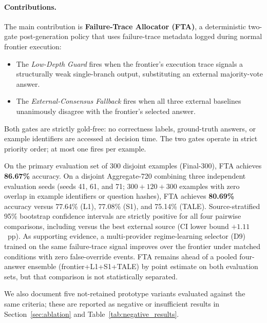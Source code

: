 \paragraph{Contributions.}
The main contribution is \textbf{Failure-Trace Allocator (FTA)}, a deterministic
two-gate post-generation policy that uses failure-trace metadata logged during normal
frontier execution:
\begin{itemize}[leftmargin=1.4em,itemsep=2pt]
  \item The \textit{Low-Depth Guard} fires when the frontier's execution trace signals
        a structurally weak single-branch output, substituting an external majority-vote
        answer.
  \item The \textit{External-Consensus Fallback} fires when all three external baselines
        unanimously disagree with the frontier's selected answer.
\end{itemize}
Both gates are strictly gold-free: no correctness labels, ground-truth answers, or
example identifiers are accessed at decision time.
The two gates operate in strict priority order; at most one fires per example.

On the primary evaluation set of 300 disjoint examples (Final-300), FTA achieves
\textbf{86.67\%} accuracy.
On a disjoint Aggregate-720 combining three independent evaluation seeds (seeds 41,
61, and 71; $300 + 120 + 300$ examples with zero overlap in example identifiers or
question hashes), FTA achieves \textbf{80.69\%} accuracy versus 77.64\% (L1),
77.08\% (S1), and 75.14\% (TALE).
Source-stratified 95\% bootstrap confidence intervals are strictly positive for all
four pairwise comparisons, including versus the best external source
(CI lower bound $+1.11$~pp).
As supporting evidence, a multi-provider regime-learning selector (D9) trained on the
same failure-trace signal improves over the frontier under matched conditions with zero
false-override events.
FTA remains ahead of a pooled four-answer ensemble (frontier+L1+S1+TALE) by point
estimate on both evaluation sets, but that comparison is not statistically separated.

We also document five not-retained prototype variants evaluated against the same
criteria; these are reported as negative or insufficient results in
Section~\ref{sec:ablation} and Table~\ref{tab:negative_results}.

